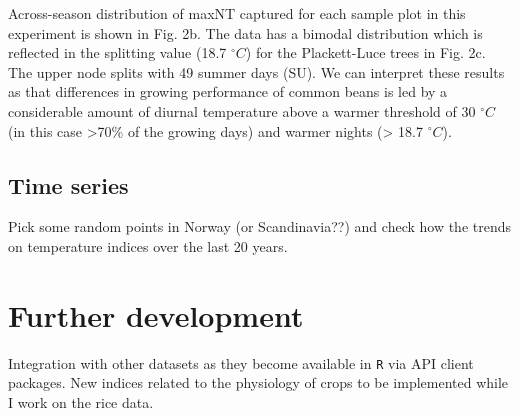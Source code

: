 \documentclass[
]{article}
\newenvironment{Shaded}{\begin{snugshade}}{\end{snugshade}}
\newcommand{\CommentTok}[1]{\textcolor[rgb]{0.56,0.35,0.01}{\textit{#1}}}
\newcommand{\DataTypeTok}[1]{\textcolor[rgb]{0.13,0.29,0.53}{#1}}
\newcommand{\DecValTok}[1]{\textcolor[rgb]{0.00,0.00,0.81}{#1}}
\newcommand{\KeywordTok}[1]{\textcolor[rgb]{0.13,0.29,0.53}{\textbf{#1}}}
\newcommand{\NormalTok}[1]{#1}
\newcommand{\OperatorTok}[1]{\textcolor[rgb]{0.81,0.36,0.00}{\textbf{#1}}}
\newcommand{\StringTok}[1]{\textcolor[rgb]{0.31,0.60,0.02}{#1}}
\begin{document}
\begin{Shaded}
\end{Shaded}

Across-season distribution of maxNT captured for each sample plot in
this experiment is shown in Fig. 2b. The data has a bimodal distribution
which is reflected in the splitting value (18.7 \(^\circ C\)) for the
Plackett-Luce trees in Fig. 2c. The upper node splits with 49 summer
days (SU). We can interpret these results as that differences in growing
performance of common beans is led by a considerable amount of diurnal
temperature above a warmer threshold of 30 \(^\circ C\) (in this case
\textgreater70\% of the growing days) and warmer nights (\textgreater{}
18.7 \(^\circ C\)).

\hypertarget{time-series}{%
\subsection{Time series}\label{time-series}}

Pick some random points in Norway (or Scandinavia??) and check how the
trends on temperature indices over the last 20 years.

\hypertarget{further-development}{%
\section{Further development}\label{further-development}}

Integration with other datasets as they become available in \texttt{R}
via API client packages. New indices related to the physiology of crops
to be implemented while I work on the rice data.
\end{document}
